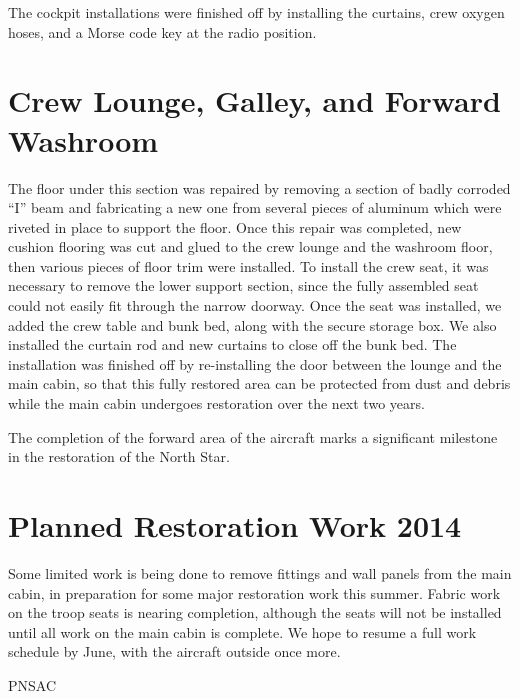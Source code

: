 The cockpit installations were finished off by installing the
curtains, crew oxygen hoses, and a Morse code key at the radio
position.

\section{Crew Lounge, Galley,  and Forward Washroom}
\label{crewlounge}

The floor under this section was repaired by removing a section
of badly corroded “I” beam and fabricating a new one from several
pieces of aluminum which were riveted in place to support the
floor.  Once this repair was completed, new cushion flooring was
cut and glued to the crew lounge and the washroom floor, then
various pieces of floor trim were installed.  To install the crew
seat, it was necessary to remove the lower support section, since
the fully assembled seat could not easily fit through the narrow
doorway.  Once the seat was installed, we added the crew table
and bunk bed, along with the secure storage box.  We also
installed the curtain rod and new curtains to close off the bunk
bed. The installation was finished off by re-installing the door
between the lounge and the main cabin, so that this fully
restored area can be protected from dust and debris while the
main cabin undergoes restoration over the next two years.

The completion of the forward area of the aircraft marks a
significant milestone in the restoration of the North Star.

\section{Planned Restoration Work 2014}
\label{sec:plannedwork}

Some limited work is being done to remove fittings and wall
panels from the main cabin, in preparation for some major
restoration work this summer.  Fabric work on the troop seats is
nearing completion, although the seats will not be installed
until all work on the main cabin is complete.  We hope to resume
a full work schedule by June, with the aircraft outside once
more.

\begin{footnotesize}
  \raggedleft PNSAC\\
\end{footnotesize}



